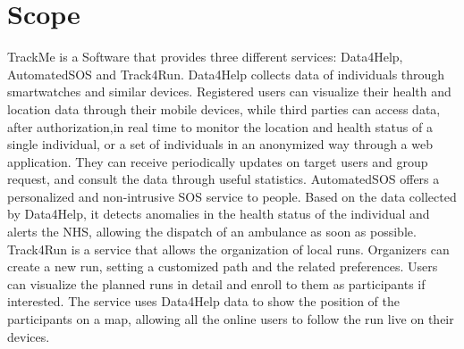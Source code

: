 \section{Scope}
 TrackMe is a Software that provides three different services: Data4Help, AutomatedSOS and Track4Run.
Data4Help collects data of individuals through smartwatches and similar devices. Registered users can visualize their health and location data through their mobile devices, while third parties can access data, after authorization,in real time to monitor the location and health status of a single individual, or a set of individuals in an anonymized way through a web application. They can receive periodically updates on target users and group request, and consult the data through useful statistics.
AutomatedSOS offers a personalized and non-intrusive SOS service to  people. Based on the
data collected by Data4Help, it detects anomalies in the health status of the individual and alerts the NHS, allowing the dispatch of an ambulance as soon as possible.
Track4Run is a service that allows the organization of local runs. Organizers can create a new run, setting a customized path and the related preferences. Users can visualize the planned runs in detail and enroll to them as participants if interested. The service uses Data4Help data to show the position of the participants on a map, allowing all the online users to follow the run live on their devices.

